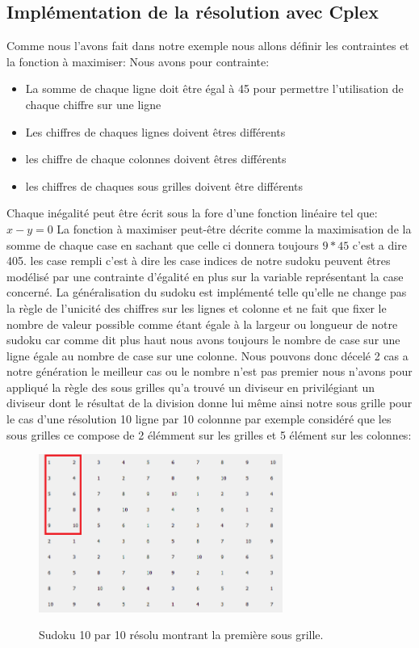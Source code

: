 \subsection{Implémentation de la résolution avec Cplex}

Comme nous l'avons fait dans notre exemple nous allons définir les contraintes et la fonction à maximiser:
Nous avons pour contrainte:
\begin{itemize}
\item La somme de chaque ligne doit être égal à 45 pour permettre l'utilisation de chaque chiffre sur une ligne
\item Les chiffres de chaques lignes doivent êtres différents
\item les chiffre de chaque colonnes doivent êtres différents
\item les chiffres de chaques sous grilles doivent être différents
\end{itemize}

Chaque inégalité peut être écrit sous la fore d'une fonction linéaire tel que:
\newline
$x-y=0$
\newline
La fonction à maximiser peut-être décrite comme la maximisation de la somme de chaque case en sachant que celle ci donnera toujours $9*45$ c'est a dire 405.
\newline
les case rempli c'est à dire les case indices de notre sudoku peuvent êtres modélisé par une contrainte d'égalité en plus sur la variable représentant la case concerné.\newline
La généralisation du sudoku est implémenté telle qu'elle ne change pas la règle de l'unicité des chiffres sur les lignes et colonne et ne fait que fixer le nombre de valeur possible comme étant égale à la largeur ou longueur de notre sudoku car comme dit plus haut nous avons toujours le nombre de case sur une ligne égale au nombre de case sur une colonne. Nous pouvons donc décelé 2 cas a notre génération le meilleur cas ou le nombre n'est pas premier nous n'avons pour appliqué la règle des sous grilles qu'a trouvé un diviseur en privilégiant un diviseur dont le résultat de la division donne lui même ainsi notre sous grille pour le cas d'une résolution 10 ligne par 10 colonnne par exemple considéré que les sous grilles ce compose de 2 élémment sur les grilles et 5 élément sur les colonnes:

\begin{figure}[h]
  \begin{center}
\includegraphics[width=8cm]{./images/10_10.png}\label{10_10}
\caption{Sudoku 10 par 10 résolu montrant la première sous grille.}
\end{center}
\end{figure}


